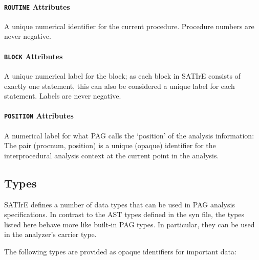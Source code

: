 \documentclass[a4paper,12pt]{report}
\begin{document}
\paragraph{\texttt{ROUTINE} Attributes}
\begin{description}
    A unique numerical identifier for the current procedure. Procedure
    numbers are never negative.
\end{description}

\paragraph{\texttt{BLOCK} Attributes}
\begin{description}
    A unique numerical label for the block; as each block in SATIrE consists
    of exactly one statement, this can also be considered a unique label for
    each statement. Labels are never negative.
\end{description}

\paragraph{\texttt{POSITION} Attributes}
\begin{description}
    A numerical label for what PAG calls the `position' of the analysis
    information: The pair (procnum, position) is a unique (opaque)
    identifier for the interprocedural analysis context at the current point
    in the analysis.
\end{description}

\subsection{Types}
\label{sec:support_types}

SATIrE defines a number of data types that can be used in PAG analysis
specifications. In contrast to the AST types defined in the syn file, the
types listed here behave more like built-in PAG types. In particular, they
can be used in the analyzer's carrier type.

The following types are provided as opaque identifiers for important data:
\end{document}
